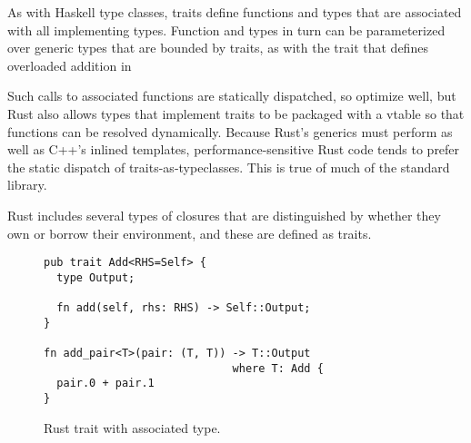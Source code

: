 As with Haskell type classes, traits define functions and types that are associated
with all implementing types. Function and types in turn can be parameterized over
generic types that are bounded by traits, as with the trait that defines overloaded
addition in 

Such calls to associated functions are statically dispatched, so optimize well,
but Rust also allows types that implement traits to be packaged with a vtable
so that functions can be resolved dynamically. Because Rust's generics must
perform as well as C++'s inlined templates, performance-sensitive Rust
code tends to prefer the static dispatch of traits-as-typeclasses.
This is true of much of the standard library.

Rust includes several types of closures that are distinguished by whether
they own or borrow their environment, and these are defined as traits.

\begin{figure}
\begin{lstlisting}
pub trait Add<RHS=Self> {
  type Output;

  fn add(self, rhs: RHS) -> Self::Output;
}

fn add_pair<T>(pair: (T, T)) -> T::Output
                             where T: Add {
  pair.0 + pair.1
}
\end{lstlisting}
  \caption{Rust trait with associated type.}
  \label{fig:fn-trait}
\end{figure}


